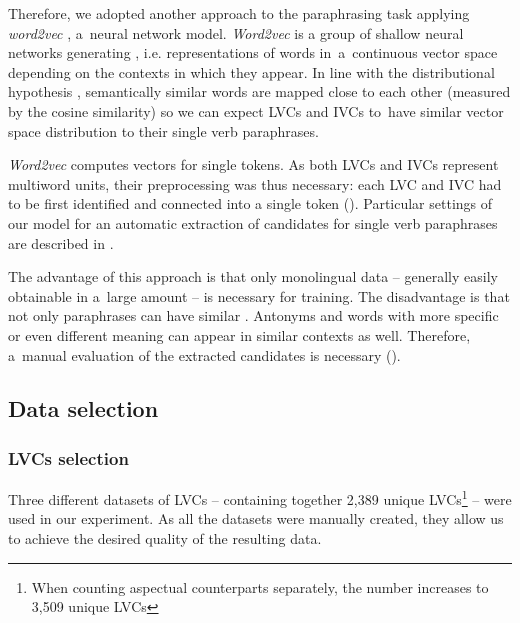 \documentclass[output=paper,modfonts,nonflat]{langsci/langscibook}
\begin{document}

Therefore, we adopted another approach to the paraphrasing task applying 
\emph{word2vec} \citep{mikolov2013}, a~neural network model. \emph{Word2vec} 
is a group of shallow neural networks generating , i.e. 
representations  of words in~a~continuous vector space depending on the 
contexts in which they appear. In line with the distributional hypothesis 
\citep{harris54}, semantically similar words are mapped close to each other 
(measured by the  cosine similarity) so we can expect LVCs and IVCs to~have 
similar vector space distribution to their single verb paraphrases. 

\emph{Word2vec} computes vectors for single tokens. As both LVCs and IVCs 
represent multiword units, their preprocessing was thus necessary: each LVC 
and IVC had to be first identified and connected into a single token 
(). Particular settings of our model for an automatic 
extraction of candidates for single verb paraphrases are described in 
.

The advantage of this approach is that only monolingual data -- generally 
easily obtainable in a~large amount -- is necessary for  
training. The disadvantage is that not only paraphrases can have similar 
. Antonyms and words with more specific or even different meaning 
can appear in similar contexts as well. Therefore, a~manual evaluation of the 
extracted candidates is necessary ().

\subsection{Data selection}
\label{sec:datasets}

\subsubsection{LVCs selection}
\label{sect:lvc-selection}

Three different datasets of LVCs -- containing together 2,389 unique LVCs\footnote{When counting aspectual counterparts separately, the number increases to 3,509 
unique LVCs} -- were used in our experiment. As all the datasets were 
manually created, they allow us to achieve the desired quality of the resulting 
data. 
\end{document}
